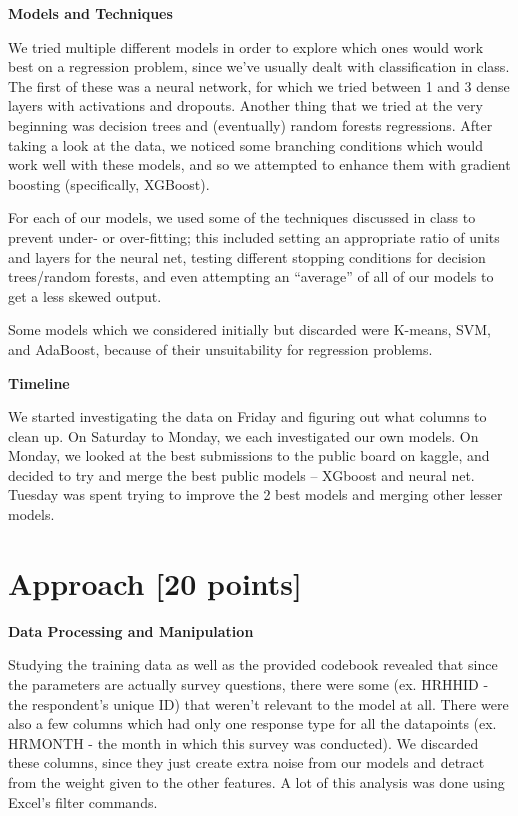 \vspace{2ex}

\noindent
\textbf{Models and Techniques}

\noindent
We tried multiple different models in order to explore which ones would work best on a regression problem, since we’ve usually dealt with classification in class. The first of these was a neural network, for which we tried between 1 and 3 dense layers with activations and dropouts. Another thing that we tried at the very beginning was decision trees and (eventually) random forests regressions. After taking a look at the data, we noticed some branching conditions which would work well with these models, and so we attempted to enhance them with gradient boosting (specifically, XGBoost). 

\noindent
For each of our models, we used some of the techniques discussed in class to prevent under- or over-fitting; this included setting an appropriate ratio of units and layers for the neural net, testing different stopping conditions for decision trees/random forests, and even attempting an “average” of all of our models to get a less skewed output.

\noindent
Some models which we considered initially but discarded were K-means, SVM, and AdaBoost, because of their unsuitability for regression problems.

\vspace{1ex}
\noindent
\textbf{Timeline}

\noindent
We started investigating the data on Friday and figuring out what columns to clean up. On Saturday to Monday, we each investigated our own models. On Monday, we looked at the best submissions to the  public board on kaggle, and decided to try and merge the best public models -- XGboost and neural net. Tuesday was spent trying to improve the 2 best models and merging other lesser models. 

\newpage

\section{Approach [20 points]}

\vspace{2ex}

\noindent
\textbf{Data Processing and Manipulation}

\noindent
Studying the training data as well as the provided codebook revealed that since the parameters are actually survey questions, there were some (ex. HRHHID - the respondent’s unique ID) that weren’t relevant to the model at all. There were also a few columns which had only one response type for all the datapoints (ex. HRMONTH - the month in which this survey was conducted). We discarded these columns, since they just create extra noise from our models and detract from the weight given to the other features. A lot of this analysis was done using Excel’s filter commands.

